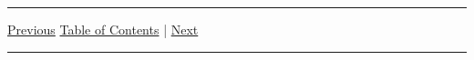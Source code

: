 \documentclass[10pt,fleqn]{article}
\begin{document}
\vskip0.1in\hrule\vskip0.1in \noindent
  \href{../../tasksheet_05/html/tasksheet_05.html}{Previous}
  \href{../../toc/md/tasksheet_toc.md}{Table of Contents} |
  \href{../../tasksheet_07/html/tasksheet_07.html}{Next}
\vskip0.1in\hrule\vskip0.1in \noindent
\end{document}
